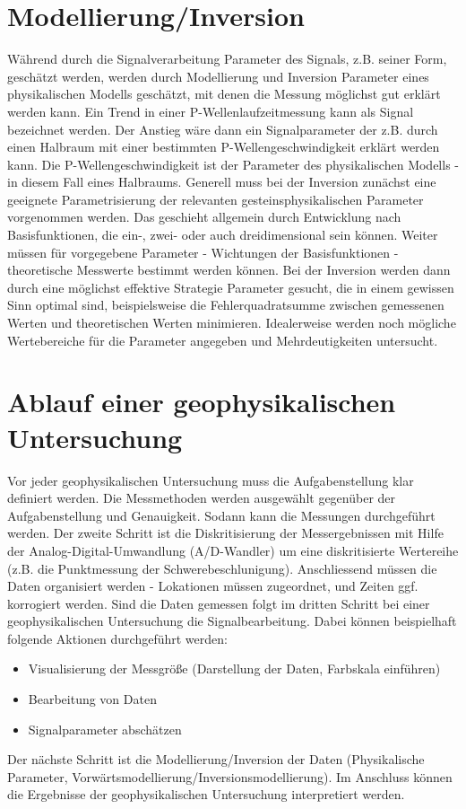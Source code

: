 \section{Modellierung/Inversion}
Während durch die Signalverarbeitung Parameter des Signals, z.B. seiner Form, geschätzt werden, werden durch Modellierung und Inversion Parameter eines phy\-sikalischen Modells geschätzt, mit denen die Messung möglichst gut erklärt werden kann. Ein Trend in einer P-Wellenlaufzeitmessung kann als Signal bezeichnet werden. Der Anstieg wäre dann ein Signalparameter der z.B. durch einen Halbraum mit einer bestimmten P-Wellengeschwindigkeit erklärt werden kann. Die P-Wellengeschwindigkeit ist der Parameter des physikalischen Modells - in diesem Fall eines Halbraums. Generell muss bei der Inversion zunächst eine geeignete Parametrisierung der relevanten gesteinsphysikalischen Parameter vorgenommen werden. Das geschieht allgemein durch Entwicklung nach Basisfunktionen, die ein-, zwei- oder auch dreidimensional sein können.  Weiter müssen für vorgegebene Parameter - Wichtungen der Basisfunktionen - theoretische Messwerte bestimmt werden können. Bei der Inversion werden dann durch eine möglichst effektive Strategie Parameter gesucht, die in einem gewissen Sinn optimal sind, beispielsweise die Fehlerquadratsumme zwischen gemessenen Werten und theoretischen Werten minimieren. Idealerweise werden noch mögliche Wertebereiche für die Parameter angegeben und Mehrdeutigkeiten untersucht.  

\section{Ablauf einer geophysikalischen Untersuchung}
Vor jeder geophysikalischen Untersuchung muss die Aufgabenstellung klar definiert werden. Die Messmethoden werden ausgewählt gegenüber der Aufgabenstellung und Genauigkeit. Sodann kann die Messungen durchgeführt werden.
Der zweite Schritt ist die Diskritisierung der Messergebnissen mit Hilfe der Analog-Digital-Umwandlung (A/D-Wandler) um eine diskritisierte Wertereihe (z.B. die Punktmessung der Schwerebeschlunigung). Anschliessend müssen die Daten organisiert werden - Lokationen müssen zugeordnet, und Zeiten ggf. korrogiert werden. Sind die Daten gemessen folgt im dritten Schritt bei einer geophysikalischen Untersuchung die Signalbearbeitung. Dabei können beispielhaft folgende Aktionen durchgeführt werden: 
\begin{itemize}
\item Visualisierung der Messgröße (Darstellung der Daten, Farbskala einführen)
\item Bearbeitung von Daten
\item Signalparameter abschätzen
\end{itemize}
Der nächste Schritt ist die Modellierung/Inversion der Daten (Physikalische Parameter, Vorwärtsmodellierung/Inversionsmodellierung). Im Anschluss können die Ergebnisse der geophysikalischen Untersuchung interpretiert werden.

